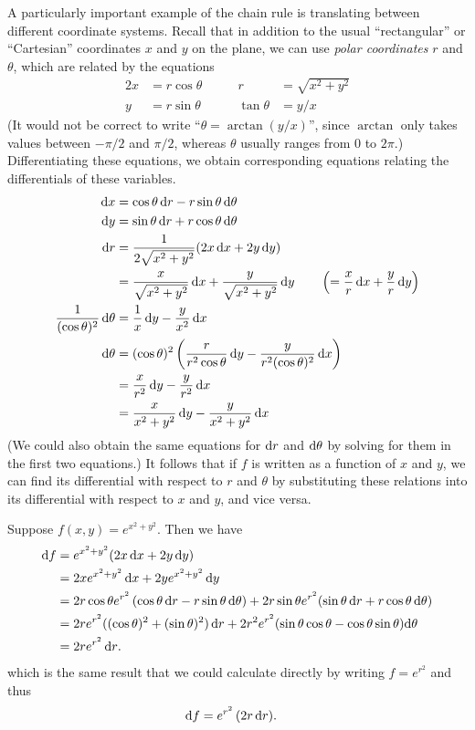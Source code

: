 A particularly important example of the chain rule is translating between different coordinate systems.
Recall that in addition to the usual ``rectangular'' or ``Cartesian'' coordinates $x$ and $y$ on the plane, we can use \emph{polar coordinates} $r$ and $\theta$, which are related by the equations
\begin{alignat*}{2}
  x &= r \cos \theta &\qquad r &= \sqrt{x^2+y^2}\\
  y &= r \sin\theta &\qquad \tan \theta &= y/x
\end{alignat*}
(It would not be correct to write ``$\theta = \arctan(y/x)$'', since $\arctan$ only takes values between $-\pi/2$ and $\pi/2$, whereas $\theta$ usually ranges from $0$ to $2\pi$.)
Differentiating these equations, we obtain corresponding equations relating the differentials of these variables.
\begin{align}
  {\ensuremath{\mathrm{d} x}} &= \cos \theta \,{\mathrm{d} r} - r \sin\theta \,{\mathrm{d} \theta} \label{eq:polar-dx} \\
  {\mathrm{d} y} &= \sin\theta \,{\mathrm{d} r} + r \cos\theta\,{\mathrm{d} \theta} \label{eq:polar-dy}\\
  {\mathrm{d} r} &= \frac{1}{2\sqrt{x^2+y^2}}(2x\,{\mathrm{d} x} + 2y\,{\mathrm{d} y}) \notag\\
  &= \frac{x}{\sqrt{x^2+y^2}}\,{\mathrm{d} x} + \frac{y}{\sqrt{x^2+y^2}}\,{\mathrm{d} y}
  \qquad\left(= \frac{x}{r} \,{\mathrm{d} x} + \frac{y}{r}\,{\mathrm{d} y}\right) \notag\\
  \frac{1}{(\cos \theta)^2} \,{\mathrm{d} \theta} &= \frac{1}{x}\,{\mathrm{d} y} - \frac{y}{x^2}\,{\mathrm{d} x} \notag\\
  {\mathrm{d} \theta} &= (\cos \theta)^2 \left( \frac{r}{r^2\cos\theta}\,{\mathrm{d} y} - \frac{y}{r^2 (\cos\theta)^2}\,{\mathrm{d} x}\right) \notag\\
  &= \frac{x}{r^2} \,{\mathrm{d} y} - \frac{y}{r^2} \,{\mathrm{d} x} \notag\\
  &= \frac{x}{x^2+y^2} \,{\mathrm{d} y} - \frac{y}{x^2+y^2} \,{\mathrm{d} x} \notag
\end{align}
(We could also obtain the same equations for ${\mathrm{d} r}$ and ${\mathrm{d} \theta}$ by solving for them in the first two equations.)
It follows that if $f$ is written as a function of $x$ and $y$, we can find its differential with respect to $r$ and $\theta$ by substituting these relations into its differential with respect to $x$ and $y$, and vice versa.

\begin{eg}
  Suppose $f(x,y) = e^{x^2+y^2}$.
  Then we have
  \begin{align*}
    {\ensuremath{\mathrm{d} f}} &= e^{x^2+y^2} (2x \,{\mathrm{d} x} + 2y\,{\mathrm{d} y})\\
    &= 2x e^{x^2+y^2} \,{\mathrm{d} x} + 2y e^{x^2+y^2} \,{\mathrm{d} y}\\
    &= 2 r\cos\theta e^{r^2} \, (\cos \theta \,{\mathrm{d} r} - r \sin\theta \,{\mathrm{d} \theta}) + 2r\sin\theta e^{r^2} (\sin\theta \,{\mathrm{d} r} + r \cos\theta\,{\mathrm{d} \theta})\\
    &= 2r e^{r^2} ((\cos\theta)^2 + (\sin\theta)^2)\,{\mathrm{d} r} + 2r^2 e^{r^2}(\sin\theta\cos\theta - \cos\theta\sin\theta) {\mathrm{d} \theta}\\
    &= 2r e^{r^2}\,{\mathrm{d} r}.
  \end{align*}
  which is the same result that we could calculate directly by writing $f = e^{r^2}$ and thus
  \begin{align*}
    {\ensuremath{\mathrm{d} f}} &= e^{r^2} \, (2r\,{\mathrm{d} r}).
  \end{align*}
\end{eg}

